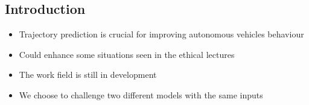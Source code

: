 \documentclass[a0,portrait]{a0poster}
\begin{document}
\begin{multicols}{2} %


\color{DarkSlateGray}%





\color{DarkSlateGray} %

\section*{Introduction}

\begin{itemize}
	\justifying
\item Trajectory prediction is crucial for improving autonomous vehicles behaviour
\item Could enhance some situations seen in the ethical lectures
\item The work field is still in development 
\item We choose to challenge two different models with the same inputs
\end{itemize}



\color{DarkSlateGray} %


\end{multicols}
\end{document}
